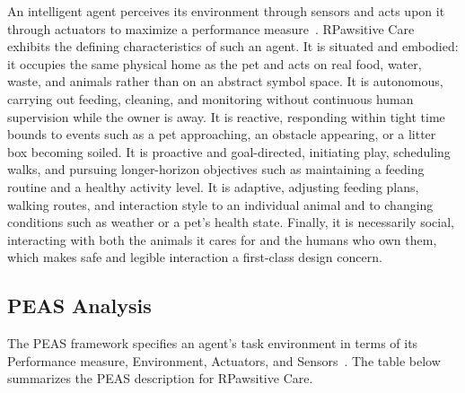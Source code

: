 \documentclass[conference,letterpaper]{IEEEtran}
\begin{document}
An intelligent agent perceives its environment through sensors and acts upon it through actuators to maximize a performance measure~\cite{aima}. RPawsitive Care exhibits the defining characteristics of such an agent. It is situated and embodied: it occupies the same physical home as the pet and acts on real food, water, waste, and animals rather than on an abstract symbol space. It is autonomous, carrying out feeding, cleaning, and monitoring without continuous human supervision while the owner is away. It is reactive, responding within tight time bounds to events such as a pet approaching, an obstacle appearing, or a litter box becoming soiled. It is proactive and goal-directed, initiating play, scheduling walks, and pursuing longer-horizon objectives such as maintaining a feeding routine and a healthy activity level. It is adaptive, adjusting feeding plans, walking routes, and interaction style to an individual animal and to changing conditions such as weather or a pet’s health state. Finally, it is necessarily social, interacting with both the animals it cares for and the humans who own them, which makes safe and legible interaction a first-class design concern.

\subsection{PEAS Analysis}

The PEAS framework specifies an agent’s task environment in terms of its Performance measure, Environment, Actuators, and Sensors~\cite{aima}. The table below summarizes the PEAS description for RPawsitive Care.
\end{document}
